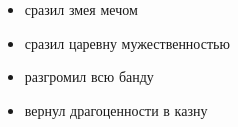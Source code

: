 \documentclass[10pt,a4paper]{altacv}
\begin{document}

\begin{itemize}
\item сразил змея мечом
\item сразил царевну мужественностью
\end{itemize}
\divider

\begin{itemize}
\item разгромил всю банду
\item вернул драгоценности в казну
\end{itemize}
 
\divider

\medskip












\end{document}
